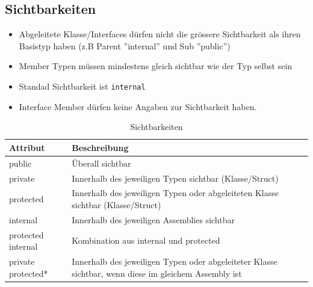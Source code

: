 \documentclass[
a4paper,
oneside,
10pt,
fleqn,
headsepline,
toc=listofnumbered, 
bibliography=totocnumbered]{scrartcl}
\begin{document}
\subsection{Sichtbarkeiten}
\begin{itemize}
	\item Abgeleitete Klasse/Interfaces dürfen nicht die grössere Sichtbarkeit als ihren Basistyp haben (z.B Parent ''internal'' und Sub ''public'')
	\item Member Typen müssen mindestens gleich sichtbar wie der Typ selbst sein
	\item Standad Sichtbarkeit ist \lstinline|internal|
	\item Interface Member dürfen keine Angaben zur Sichtbarkeit haben.
\end{itemize}
\begin{table}[ht]
	\centering
	\begin{tabu} to \linewidth {l l}
		\toprule
		Attribut           & Beschreibung                                                                                          \\
		\midrule
		public             & Überall sichtbar                                                                                      \\
		private            & Innerhalb des jeweiligen Typen sichtbar (Klasse/Struct)                                               \\
		protected          & Innerhalb des jeweiligen Typen oder abgeleiteten Klasse sichtbar (Klasse/Struct)                      \\
		internal           & Innerhalb des jeweiligen Assemblies sichtbar                                                          \\
		protected internal & Kombination aus internal und protected                                                                \\
		private protected* & Innerhalb des jeweiligen Typen oder abgeleiteter Klasse sichtbar, wenn diese im gleichem Assembly ist \\
		\bottomrule
	\end{tabu}
	\caption{Sichtbarkeiten}
\end{table}
\end{document}
